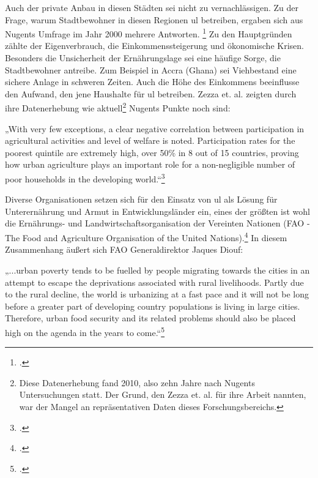 \documentclass{scrartcl}
\begin{document}
Auch der private Anbau in diesen Städten sei nicht zu vernachlässigen. Zu der Frage, warum Stadtbewohner in diesen Regionen \acs{ul} betreiben, ergaben sich aus Nugents Umfrage im Jahr 2000 mehrere Antworten. \footcite[Vgl.][S.74]{Nugent2000TheEconomies} Zu den Hauptgründen zählte der Eigenverbrauch, die Einkommenssteigerung und ökonomische Krisen. Besonders die Unsicherheit der Ernährungslage sei eine häufige Sorge, die Stadtbewohner antreibe. Zum Beispiel in Accra (Ghana) sei Viehbestand eine sichere Anlage in schweren Zeiten. Auch die Höhe des Einkommens beeinflusse den Aufwand, den jene Haushalte für \acs{ul} betreiben. Zezza et. al. zeigten durch ihre Datenerhebung wie aktuell\footnote{Diese Datenerhebung fand 2010, also zehn Jahre nach Nugents Untersuchungen statt. Der Grund, den Zezza et. al. für ihre Arbeit nannten, war der Mangel an repräsentativen Daten dieses Forschungsbereichs.} Nugents Punkte noch sind:
\begin{displayquote}
„With very few exceptions, a clear negative correlation between participation in agricultural activities and level of welfare is noted. Participation rates for the poorest quintile are extremely high, over 50\% in 8 out of 15 countries, proving how urban agriculture plays an important role for a non-negligible number of poor households in the developing world.“\footcite[S.268]{Zezza2010UrbanCountries}
\end{displayquote}

Diverse Organisationen setzen sich für den Einsatz von \acs{ul} als Lösung für Unterernährung und Armut in Entwicklungsländer ein, eines der größten ist wohl die Ernährungs- und Landwirtschaftsorganisation der Vereinten Nationen (FAO - The Food and Agriculture Organisation of the United Nations).\footcite[Vgl.][S.6ff]{FAOAboutNations} In diesem Zusammenhang äußert sich FAO Generaldirektor Jaques Diouf:

\begin{displayquote}
„\lbrack...\rbrack urban poverty tends to be fuelled by people migrating towards the cities in an attempt to escape the deprivations associated with rural livelihoods. Partly due to the rural decline, the world is urbanizing at a fast pace and it will not be long before a greater part of developing country populations is living in large cities. Therefore, urban food security and its related problems should also be placed high on the agenda in the years to come.“\footcite[S.5f]{FoodandAgricultureOrganizationoftheUnitedNations2006The2006}
\end{displayquote}
\end{document}
